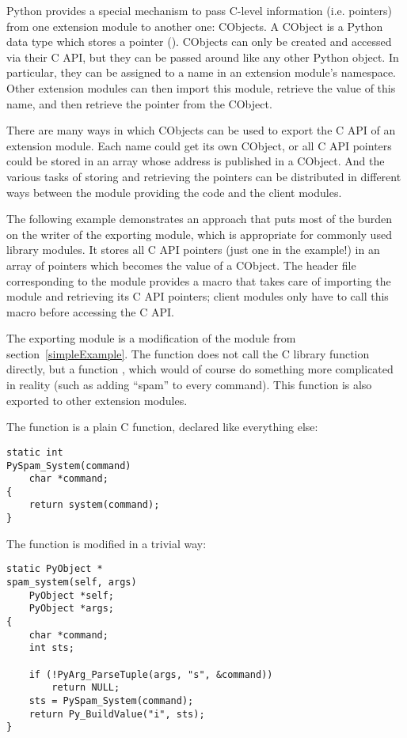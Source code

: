 \documentclass{manual}
\begin{document}
Python provides a special mechanism to pass C-level information (i.e.
pointers) from one extension module to another one: CObjects.
A CObject is a Python data type which stores a pointer ().  CObjects can only be created and accessed via their C API, but
they can be passed around like any other Python object. In particular, 
they can be assigned to a name in an extension module's namespace.
Other extension modules can then import this module, retrieve the
value of this name, and then retrieve the pointer from the CObject.

There are many ways in which CObjects can be used to export the C API
of an extension module. Each name could get its own CObject, or all C
API pointers could be stored in an array whose address is published in
a CObject. And the various tasks of storing and retrieving the pointers
can be distributed in different ways between the module providing the
code and the client modules.

The following example demonstrates an approach that puts most of the
burden on the writer of the exporting module, which is appropriate
for commonly used library modules. It stores all C API pointers
(just one in the example!) in an array of  pointers which
becomes the value of a CObject. The header file corresponding to
the module provides a macro that takes care of importing the module
and retrieving its C API pointers; client modules only have to call
this macro before accessing the C API.

The exporting module is a modification of the  module from
section~\ref{simpleExample}. The function 
does not call the C library function  directly,
but a function , which would of course do
something more complicated in reality (such as adding ``spam'' to
every command). This function  is also
exported to other extension modules.

The function  is a plain C function,
declared  like everything else:

\begin{verbatim}
static int
PySpam_System(command)
    char *command;
{
    return system(command);
}
\end{verbatim}

The function  is modified in a trivial way:

\begin{verbatim}
static PyObject *
spam_system(self, args)
    PyObject *self;
    PyObject *args;
{
    char *command;
    int sts;

    if (!PyArg_ParseTuple(args, "s", &command))
        return NULL;
    sts = PySpam_System(command);
    return Py_BuildValue("i", sts);
}
\end{verbatim}
\end{document}
